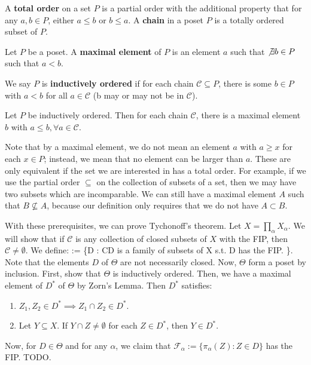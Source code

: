 	\begin{definition}
		A \textbf{total order} on a set $P$ is a partial order with the additional property that for any $a, b\in P$, either 
		$a\leq b$ or $b\leq a$. A \textbf{chain} in a poset $P$ is a totally ordered subset of $P$. 
	\end{definition}
	
	\begin{definition}
		Let $P$ be a poset. A \textbf{maximal element} of $P$ is an element $a$ such that $\not\exists b\in P$ such that 
		$a < b$. 
	\end{definition}
	
	\begin{definition}
		We say $P$ is \textbf{inductively ordered} if for each chain $\mathcal C\subseteq P$, there is some $b\in P$ with 
		$a < b$ for all $a\in\mathcal C$ (b may or may not be in $\mathcal C$). 
	\end{definition}
	
	\begin{theorem}
		Let $P$ be inductively ordered. Then for each chain $\mathcal C$, there is a maximal element $b$ with 
		$a\leq b, \forall a\in\mathcal C$.
	\end{theorem}
	
	Note that by a maximal element, we do not mean an element $a$ with $a\geq x$ for each $x\in P$; instead, we mean 
	that no element can be larger than $a$. These are only equivalent if the set we are interested in has a total order. 
	For example, if we use the partial order $\subseteq$ on the collection of subsets of a set, then we may have two 
	subsets which are incomparable. We can still have a maximal element $A$ such that $B\not\subseteq A$, because 
	our definition only requires that we do not have $A\subset B$. 
	
	With these prerequisites, we can prove Tychonoff's theorem. Let $X = \prod_\alpha X_\alpha$. We will show that if 
	$\mathcal C$ is any collection of closed subsets of $X$ with the FIP, then $\mathcal C\neq\emptyset$. We define:
	\eq
		\Theta := \left\{D : \mathcal C\subseteq D\textnormal{ is a family of subsets of } X \textnormal{ s.t. } D \textnormal{ has 
		the FIP.} \right\}.
	\qe
	Note that the elements $D$ of $\Theta$ are not necessarily closed. Now, $\Theta$ form a poset by inclusion. First, 
	show that $\Theta$ is inductively ordered. Then, we have a maximal element of $D^*$ of $\Theta$ by Zorn's Lemma.
	Then $D^*$ satisfies:
	\begin{enumerate}
		\item $Z_1, Z_2\in D^*\implies Z_1\cap Z_2\in D^*$.
		\item Let $Y\subseteq X$. If $Y\cap Z\neq\emptyset$ for each $Z\in D^*$, then $Y\in D^*$.
	\end{enumerate}
	Now, for $D\in\Theta$ and for any $\alpha$, we claim that $\mathcal F_\alpha :=\{\pi_\alpha(Z) : Z\in D\}$ has the FIP. 
	TODO.
	
